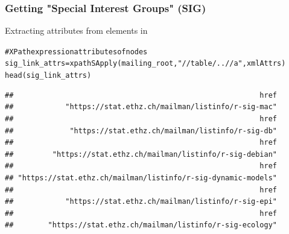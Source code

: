 \documentclass{beamer}\usepackage[]{graphicx}\usepackage[]{color}
\makeatletter
\newcommand{\hlstr}[1]{\textcolor[rgb]{0.063,0.58,0.627}{#1}}%
\newcommand{\hlcom}[1]{\textcolor[rgb]{0.588,0.588,0.588}{#1}}%
\newcommand{\hlstd}[1]{\textcolor[rgb]{0.196,0.196,0.196}{#1}}%
\newcommand{\hlkwb}[1]{\textcolor[rgb]{0.627,0,0.314}{#1}}%
\newcommand{\hlkwd}[1]{\textcolor[rgb]{0.78,0.227,0.412}{#1}}%
\newenvironment{kframe}{%
 \def\at@end@of@kframe{}%
 \ifinner\ifhmode%
  \def\at@end@of@kframe{\end{minipage}}%
  \begin{minipage}{\columnwidth}%
 \fi\fi%
 \def\FrameCommand##1{\hskip\@totalleftmargin \hskip-\fboxsep
 \colorbox{shadecolor}{##1}\hskip-\fboxsep
     \hskip-\linewidth \hskip-\@totalleftmargin \hskip\columnwidth}%
 \MakeFramed {\advance\hsize-\width
   \@totalleftmargin\z@ \linewidth\hsize
   \@setminipage}}%
 {\par\unskip\endMakeFramed%
 \at@end@of@kframe}
\newenvironment{knitrout}{}{} %
\makeatother
\begin{document}
\begin{frame}[fragile]
\frametitle{Getting "Special Interest Groups" (SIG)}

Extracting attributes from  elements in 
\begin{knitrout}\tiny
{}\color{fgcolor}\begin{kframe}
\begin{alltt}
\hlcom{# XPath expression attributes of nodes}
\hlstd{sig_link_attrs} \hlkwb{=} \hlkwd{xpathSApply}\hlstd{(mailing_root,} \hlstr{"//table/..//a"}\hlstd{, xmlAttrs)}
\hlkwd{head}\hlstd{(sig_link_attrs)}
\end{alltt}
\begin{verbatim}
##                                                         href 
##            "https://stat.ethz.ch/mailman/listinfo/r-sig-mac" 
##                                                         href 
##             "https://stat.ethz.ch/mailman/listinfo/r-sig-db" 
##                                                         href 
##         "https://stat.ethz.ch/mailman/listinfo/r-sig-debian" 
##                                                         href 
## "https://stat.ethz.ch/mailman/listinfo/r-sig-dynamic-models" 
##                                                         href 
##            "https://stat.ethz.ch/mailman/listinfo/r-sig-epi" 
##                                                         href 
##        "https://stat.ethz.ch/mailman/listinfo/r-sig-ecology"
\end{verbatim}
\end{kframe}
\end{knitrout}

\end{frame}

\end{document}
